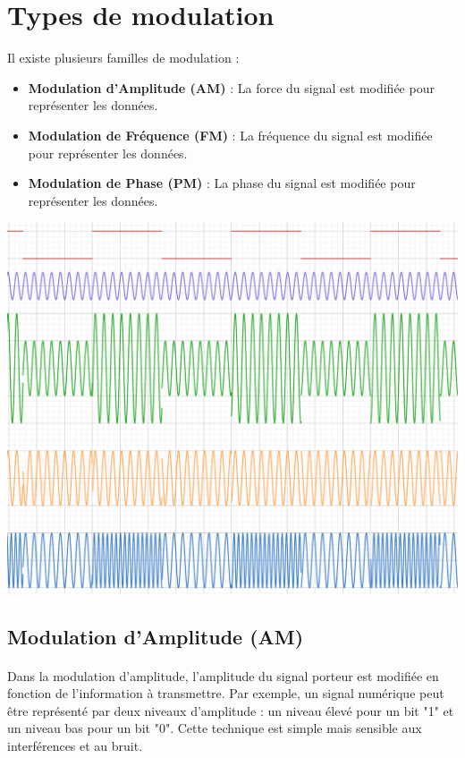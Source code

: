 \documentclass[a4paper,draft,twocolumn]{report}
\begin{document}
\section{Types de modulation}
Il existe plusieurs familles de modulation :
\begin{itemize}
    \item \textbf{Modulation d'Amplitude (AM)} : La force du signal est modifiée pour représenter les données.
    \item \textbf{Modulation de Fréquence (FM)} : La fréquence du signal est modifiée pour représenter les données.
    \item \textbf{Modulation de Phase (PM)} : La phase du signal est modifiée pour représenter les données.
\end{itemize}

\includegraphics[scale=0.35]{images/ModulationExemple.png}

\subsection{Modulation d'Amplitude (AM)}
\paragraph{}Dans la modulation d'amplitude, l'amplitude du signal porteur est modifiée en fonction de l'information à transmettre. Par exemple, un signal numérique peut être représenté par deux niveaux d'amplitude : un niveau élevé pour un bit "1" et un niveau bas pour un bit "0". Cette technique est simple mais sensible aux interférences et au bruit.
\end{document}
